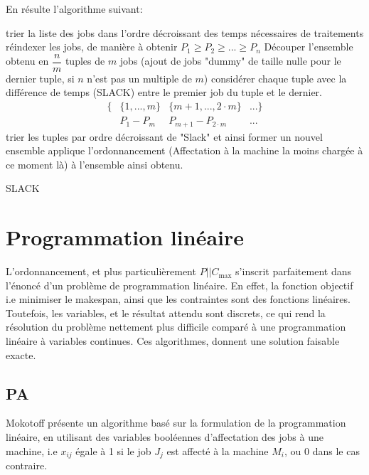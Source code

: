 \documentclass[a4paper,12pt]{report}
\theoremstyle{plain}				%
\theoremstyle{definition}				%
\newcommand\problemGrahamP{$P||C_{\max}$\xspace}
\begin{document}
En résulte l'algorithme suivant:

\bigskip
\begin{algorithm}[H]
\DontPrintSemicolon

trier la liste des jobs dans l'ordre décroissant des temps nécessaires de traitements \;
réindexer les jobs, de manière à obtenir $P_1 \geq P_2 \geq ... \geq P_n$ \;
Découper l'ensemble obtenu en $\dfrac{n}{m}$ tuples de $m$ jobs (ajout
de jobs "dummy" de taille nulle pour le dernier tuple, si $n$ n'est
pas un multiple de $m$) \;
considérer chaque tuple avec la différence de temps (SLACK) entre le
premier job du tuple et le dernier.
\begin{align*}
\{ &\{1, ..., m\} &\{m+1,..., 2 \cdot m\} &... \} \\
   &P_1 - P_m     &P_{m+1}-P_{2 \cdot m}  &...
\end{align*} \;
trier les tuples par ordre décroissant de "Slack" et ainsi former un nouvel ensemble
applique l'ordonnancement (Affectation à la machine la moins chargée à ce moment là) à l'ensemble ainsi obtenu.
\caption{SLACK\label{algo:SLACK}}
\end{algorithm}

\section{Programmation linéaire}

L'ordonnancement, et plus particulièrement \problemGrahamP s'inscrit
parfaitement dans l'énoncé d'un problème de programmation linéaire.
En effet, la fonction objectif i.e minimiser le makespan, ainsi que
les contraintes sont des fonctions linéaires.
Toutefois, les variables, et le résultat attendu sont discrets, ce qui
rend la résolution du problème nettement plus difficile comparé à une
programmation linéaire à variables continues.
Ces algorithmes, donnent une solution faisable exacte.

\subsection{PA} %

Mokotoff \cite{mokoto1999scheduling} présente un algorithme basé sur
la formulation de la programmation linéaire, en utilisant des
variables booléennes d'affectation des jobs à une machine, i.e $x_{ij}$ égale à 1 si le job $J_j$ est affecté à la machine $M_i$, ou 0 dans le cas contraire.
\end{document}
